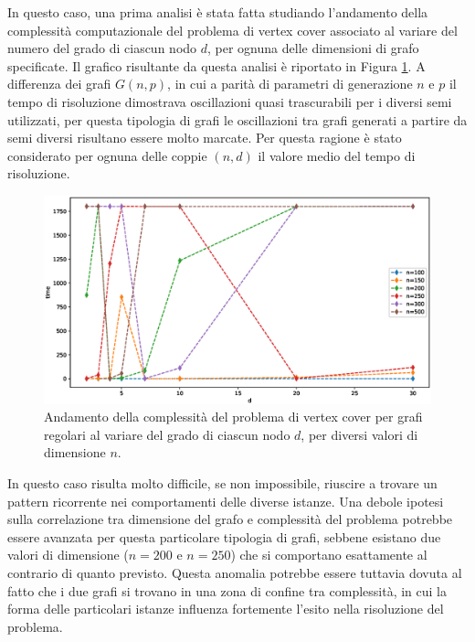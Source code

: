 In questo caso, una prima analisi è stata fatta studiando l'andamento della complessità computazionale del problema di vertex cover associato al variare del numero del grado di ciascun nodo $d$, per ognuna delle dimensioni di grafo specificate. Il grafico risultante da questa analisi è riportato in Figura \ref{fig:rrgd}. A differenza dei grafi $G(n,p)$, in cui a parità di parametri di generazione $n$ e $p$ il tempo di risoluzione dimostrava oscillazioni quasi trascurabili per i diversi semi utilizzati, per questa tipologia di grafi le oscillazioni tra grafi generati a partire da semi diversi risultano essere molto marcate. Per questa ragione è stato considerato per ognuna delle coppie $(n,d)$ il valore medio del tempo di risoluzione. 
\vspace{-1cm}
\begin{figure}[h!]
     \centering
       \includegraphics[scale=0.5]{images/rrg-d.eps}
       \caption{Andamento della complessità del problema di vertex cover per grafi regolari al variare del grado di ciascun nodo $d$, per diversi valori di dimensione $n$.}
        \label{fig:rrgd}
\end{figure}

In questo caso risulta molto difficile, se non impossibile, riuscire a trovare un pattern ricorrente nei comportamenti delle diverse istanze. Una debole ipotesi sulla correlazione tra dimensione del grafo e complessità del problema potrebbe essere avanzata per questa particolare tipologia di grafi, sebbene esistano due valori di dimensione ($n=200$ e $n=250$) che si comportano esattamente al contrario di quanto previsto. Questa anomalia potrebbe essere tuttavia dovuta al fatto che i due grafi si trovano in una zona di confine tra complessità, in cui la forma delle particolari istanze influenza fortemente l'esito nella risoluzione del problema.

